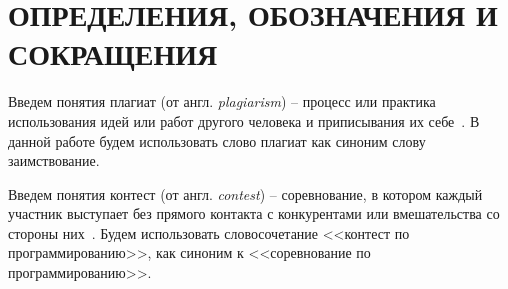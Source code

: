 \section*{ОПРЕДЕЛЕНИЯ, ОБОЗНАЧЕНИЯ И СОКРАЩЕНИЯ}

Введем понятия плагиат (от англ. \textit{plagiarism}) --  процесс или практика использования идей или работ другого человека и приписывания их себе~\cite{plagiat}. В данной работе будем использовать слово плагиат как синоним слову заимствование.

Введем понятия контест (от англ. \textit{contest}) --  соревнование, в котором каждый участник выступает без прямого контакта с конкурентами или вмешательства со стороны них~\cite{contest}. Будем использовать словосочетание <<контест по программированию>>, как синоним к <<соревнование по программированию>>.

\pagebreak